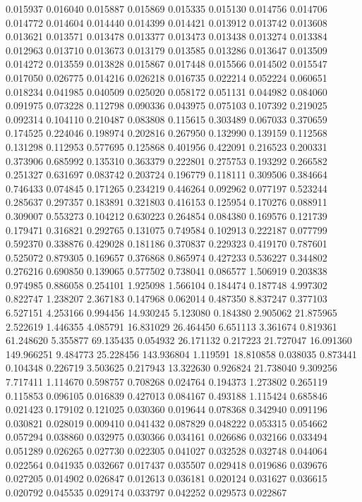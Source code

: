 0.015937
0.016040
0.015887
0.015869
0.015335
0.015130
0.014756
0.014706
0.014772
0.014604
0.014440
0.014399
0.014421
0.013912
0.013742
0.013608
0.013621
0.013571
0.013478
0.013377
0.013473
0.013438
0.013274
0.013384
0.012963
0.013710
0.013673
0.013179
0.013585
0.013286
0.013647
0.013509
0.014272
0.013559
0.013828
0.015867
0.017448
0.015566
0.014502
0.015547
0.017050
0.026775
0.014216
0.026218
0.016735
0.022214
0.052224
0.060651
0.018234
0.041985
0.040509
0.025020
0.058172
0.051131
0.044982
0.084060
0.091975
0.073228
0.112798
0.090336
0.043975
0.075103
0.107392
0.219025
0.092314
0.104110
0.210487
0.083808
0.115615
0.303489
0.067033
0.370659
0.174525
0.224046
0.198974
0.202816
0.267950
0.132990
0.139159
0.112568
0.131298
0.112953
0.577695
0.125868
0.401956
0.422091
0.216523
0.200331
0.373906
0.685992
0.135310
0.363379
0.222801
0.275753
0.193292
0.266582
0.251327
0.631697
0.083742
0.203724
0.196779
0.118111
0.309506
0.384664
0.746433
0.074845
0.171265
0.234219
0.446264
0.092962
0.077197
0.523244
0.285637
0.297357
0.183891
0.321803
0.416153
0.125954
0.170276
0.088911
0.309007
0.553273
0.104212
0.630223
0.264854
0.084380
0.169576
0.121739
0.179471
0.316821
0.292765
0.131075
0.749584
0.102913
0.222187
0.077799
0.592370
0.338876
0.429028
0.181186
0.370837
0.229323
0.419170
0.787601
0.525072
0.879305
0.169657
0.376868
0.865974
0.427233
0.536227
0.344802
0.276216
0.690850
0.139065
0.577502
0.738041
0.086577
1.506919
0.203838
0.974985
0.886058
0.254101
1.925098
1.566104
0.184474
0.187748
4.997302
0.822747
1.238207
2.367183
0.147968
0.062014
0.487350
8.837247
0.377103
6.527151
4.253166
0.994456
14.930245
5.123080
0.184380
2.905062
21.875965
2.522619
1.446355
4.085791
16.831029
26.464450
6.651113
3.361674
0.819361
61.248620
5.355877
69.135435
0.054932
26.171132
0.217223
21.727047
16.091360
149.966251
9.484773
25.228456
143.936804
1.119591
18.810858
0.038035
0.873441
0.104348
0.226719
3.503625
0.217943
13.322630
0.926824
21.738040
9.309256
7.717411
1.114670
0.598757
0.708268
0.024764
0.194373
1.273802
0.265119
0.115853
0.096105
0.016839
0.427013
0.084167
0.493188
1.115424
0.685846
0.021423
0.179102
0.121025
0.030360
0.019644
0.078368
0.342940
0.091196
0.030821
0.028019
0.009410
0.041432
0.087829
0.048222
0.053315
0.054662
0.057294
0.038860
0.032975
0.030366
0.034161
0.026686
0.032166
0.033494
0.051289
0.026265
0.027730
0.022305
0.041027
0.032528
0.032748
0.044064
0.022564
0.041935
0.032667
0.017437
0.035507
0.029418
0.019686
0.039676
0.027205
0.014902
0.026847
0.012613
0.036181
0.020124
0.031627
0.036615
0.020792
0.045535
0.029174
0.033797
0.042252
0.029573
0.022867
